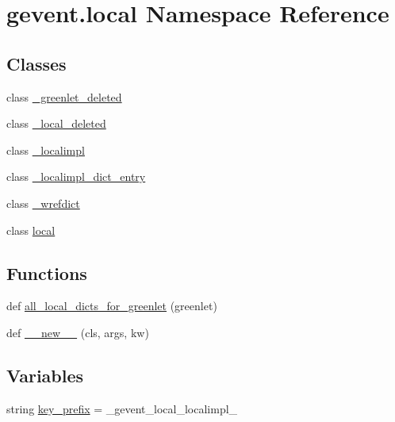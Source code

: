 \hypertarget{namespacegevent_1_1local}{}\section{gevent.\+local Namespace Reference}
\label{namespacegevent_1_1local}
\subsection*{Classes}
\begin{DoxyCompactItemize}
\item 
class \hyperlink{classgevent_1_1local_1_1__greenlet__deleted}{\+\_\+greenlet\+\_\+deleted}
\item 
class \hyperlink{classgevent_1_1local_1_1__local__deleted}{\+\_\+local\+\_\+deleted}
\item 
class \hyperlink{classgevent_1_1local_1_1__localimpl}{\+\_\+localimpl}
\item 
class \hyperlink{classgevent_1_1local_1_1__localimpl__dict__entry}{\+\_\+localimpl\+\_\+dict\+\_\+entry}
\item 
class \hyperlink{classgevent_1_1local_1_1__wrefdict}{\+\_\+wrefdict}
\item 
class \hyperlink{classgevent_1_1local_1_1local}{local}
\end{DoxyCompactItemize}
\subsection*{Functions}
\begin{DoxyCompactItemize}
\item 
def \hyperlink{namespacegevent_1_1local_a7c64f3274eade7af20a74b11b7fb8406}{all\+\_\+local\+\_\+dicts\+\_\+for\+\_\+greenlet} (greenlet)
\item 
def \hyperlink{namespacegevent_1_1local_a7f1cd15dc008b574836a1b7489435fbe}{\+\_\+\+\_\+new\+\_\+\+\_\+} (cls, args, kw)
\end{DoxyCompactItemize}
\subsection*{Variables}
\begin{DoxyCompactItemize}
\item 
string \hyperlink{namespacegevent_1_1local_a868e452a4e35f8b70506f6e56609a2b7}{key\+\_\+prefix} = \textquotesingle{}\+\_\+gevent\+\_\+local\+\_\+localimpl\+\_\+\textquotesingle{}
\end{DoxyCompactItemize}


